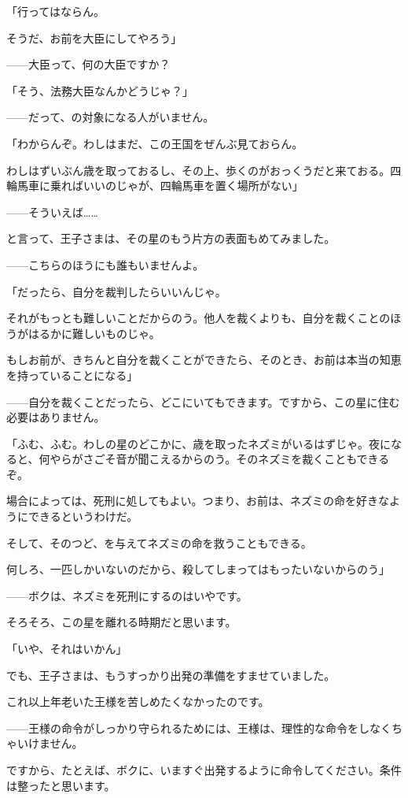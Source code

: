 「行ってはならん。

そうだ、お前を大臣にしてやろう」

——大臣って、何の大臣ですか？

「そう、法務大臣なんかどうじゃ？」

——だって、の対象になる人がいません。

「わからんぞ。わしはまだ、この王国をぜんぶ見ておらん。

わしはずいぶん歳を取っておるし、その上、歩くのがおっくうだと来ておる。四輪馬車に乗ればいいのじゃが、四輪馬車を置く場所がない」

——そういえば……

と言って、王子さまは、その星のもう片方の表面もめてみました。

——こちらのほうにも誰もいませんよ。

「だったら、自分を裁判したらいいんじゃ。

それがもっとも難しいことだからのう。他人を裁くよりも、自分を裁くことのほうがはるかに難しいものじゃ。

もしお前が、きちんと自分を裁くことができたら、そのとき、お前は本当の知恵を持っていることになる」

——自分を裁くことだったら、どこにいてもできます。ですから、この星に住む必要はありません。

「ふむ、ふむ。わしの星のどこかに、歳を取ったネズミがいるはずじゃ。夜になると、何やらがさごそ音が聞こえるからのう。そのネズミを裁くこともできるぞ。

場合によっては、死刑に処してもよい。つまり、お前は、ネズミの命を好きなようにできるというわけだ。

そして、そのつど、を与えてネズミの命を救うこともできる。

何しろ、一匹しかいないのだから、殺してしまってはもったいないからのう」

——ボクは、ネズミを死刑にするのはいやです。

そろそろ、この星を離れる時期だと思います。

「いや、それはいかん」

でも、王子さまは、もうすっかり出発の準備をすませていました。

これ以上年老いた王様を苦しめたくなかったのです。

——王様の命令がしっかり守られるためには、王様は、理性的な命令をしなくちゃいけません。

ですから、たとえば、ボクに、いますぐ出発するように命令してください。条件は整ったと思います。

